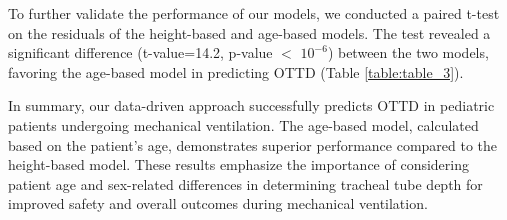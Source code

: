 \documentclass[11pt]{article}
\begin{document}
\begin{table}[h]
\caption{Root Mean Square Error (RMSE) of the models}
\label{table:table_2}
\begin{threeparttable}
\renewcommand{\TPTminimum}{\linewidth}
\begin{tablenotes}
\footnotesize
\item 
\end{tablenotes}
\end{threeparttable}
\end{table}


To further validate the performance of our models, we conducted a paired t-test on the residuals of the height-based and age-based models. The test revealed a significant difference (t-value=14.2, p-value $<$ $10^{-6}$) between the two models, favoring the age-based model in predicting OTTD (Table {}\ref{table:table_3}).

\begin{table}[h]
\caption{Paired t-Test Residuals}
\label{table:table_3}
\begin{threeparttable}
\renewcommand{\TPTminimum}{\linewidth}
\begin{tablenotes}
\footnotesize
\item 
\end{tablenotes}
\end{threeparttable}
\end{table}


In summary, our data-driven approach successfully predicts OTTD in pediatric patients undergoing mechanical ventilation. The age-based model, calculated based on the patient's age, demonstrates superior performance compared to the height-based model. These results emphasize the importance of considering patient age and sex-related differences in determining tracheal tube depth for improved safety and overall outcomes during mechanical ventilation.
\end{document}
